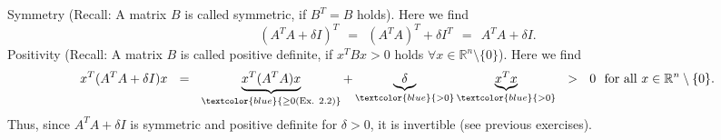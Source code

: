 {
\color{solution}
Symmetry (Recall: A matrix $B$ is called symmetric, if $B^T=B$ holds). Here we find\\
	$$(A^TA +\delta I)^T \ \ =\ \ (A^TA)^T+\delta I^T\ \ =\ \ A^TA+\delta I.$$
Positivity (Recall: A matrix $B$ is called positive definite, if $x^TBx> 0$ holds $\forall x\in\mathbb{R}^n\setminus\{0\}$). Here we find\\
	$$x^T(A^TA+\delta I)x\ \ =\ \ \underbrace{x^T(A^TA)x}_{ \textcolor{blue}{\geq 0\text{(Ex. 2.2)}}}+\underbrace{\delta}_{\textcolor{blue}{>0}}\underbrace{x^Tx}_{\textcolor{blue}{>0}}\ \ >\ \ 0\ \ \text{for all}~ x\in\mathbb{R}^n\setminus\{0\}.$$
Thus, since $A^TA+\delta I$ is symmetric and positive definite for $\delta > 0$, it is invertible (see previous exercises).
}